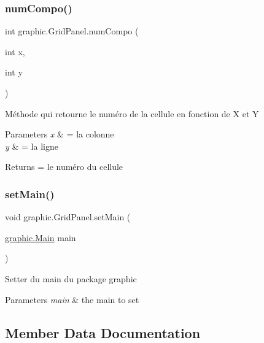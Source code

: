 \subsubsection{\texorpdfstring{num\+Compo()}{numCompo()}}
{\footnotesize\ttfamily int graphic.\+Grid\+Panel.\+num\+Compo (\begin{DoxyParamCaption}\item[{int}]{x,  }\item[{int}]{y }\end{DoxyParamCaption})}

Méthode qui retourne le numéro de la cellule en fonction de X et Y 
\begin{DoxyParams}{Parameters}
{\em x} & = la colonne \\
\hline
{\em y} & = la ligne \\
\hline
\end{DoxyParams}
\begin{DoxyReturn}{Returns}
= le numéro du cellule 
\end{DoxyReturn}
\hypertarget{classgraphic_1_1_grid_panel_ac4091164ae46504588cbeb9f22430de0}{}\label{classgraphic_1_1_grid_panel_ac4091164ae46504588cbeb9f22430de0} 
\subsubsection{\texorpdfstring{set\+Main()}{setMain()}}
{\footnotesize\ttfamily void graphic.\+Grid\+Panel.\+set\+Main (\begin{DoxyParamCaption}\item[{\hyperlink{classgraphic_1_1_main}{graphic.\+Main}}]{main }\end{DoxyParamCaption})}

Setter du main du package graphic 
\begin{DoxyParams}{Parameters}
{\em main} & the main to set \\
\hline
\end{DoxyParams}


\subsection{Member Data Documentation}
\hypertarget{classgraphic_1_1_grid_panel_a03acd6ba4608c434fead05a4c37d170a}{}\label{classgraphic_1_1_grid_panel_a03acd6ba4608c434fead05a4c37d170a} 
